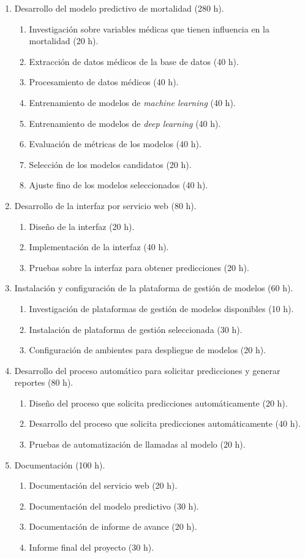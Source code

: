 \documentclass[
11pt, %
]{charter}
\begin{document}
\begin{enumerate}
\item Desarrollo del modelo predictivo de mortalidad (280 h).
	\begin{enumerate}
	\item Investigación sobre variables médicas que tienen influencia en la mortalidad (20 h).
	\item Extracción de datos médicos de la base de datos (40 h).
	\item Procesamiento de datos médicos (40 h).
	\item Entrenamiento de modelos de \textit{machine learning} (40 h).
	\item Entrenamiento de modelos de \textit{deep learning} (40 h).
	\item Evaluación de métricas de los modelos (40 h).
	\item Selección de los modelos candidatos (20 h).
	\item Ajuste fino de los modelos seleccionados (40 h).	
	\end{enumerate}
\item Desarrollo de la interfaz por servicio web (80 h).
	\begin{enumerate}
	\item Diseño de la interfaz (20 h).
	\item Implementación de la interfaz (40 h).
	\item Pruebas sobre la interfaz para obtener predicciones (20 h).	
	\end{enumerate}
\item Instalación y configuración de la plataforma de gestión de modelos (60 h).
	\begin{enumerate}
	\item Investigación de plataformas de gestión de modelos disponibles (10 h).
	\item Instalación de plataforma de gestión seleccionada (30 h).
	\item Configuración de ambientes para despliegue de modelos (20 h).
	\end{enumerate}
\item Desarrollo del proceso automático para solicitar predicciones y generar reportes (80 h).
	\begin{enumerate}
	\item Diseño del proceso que solicita predicciones automáticamente (20 h).
	\item Desarrollo del proceso que solicita predicciones automáticamente (40 h).
	\item Pruebas de automatización de llamadas al modelo (20 h).
	\end{enumerate}
\item Documentación (100 h).
	\begin{enumerate}
	\item Documentación del servicio web (20 h).
	\item Documentación del modelo predictivo (30 h).
	\item Documentación de informe de avance (20 h).
	\item Informe final del proyecto (30 h).
	\end{enumerate}
\end{enumerate}
\end{document}
